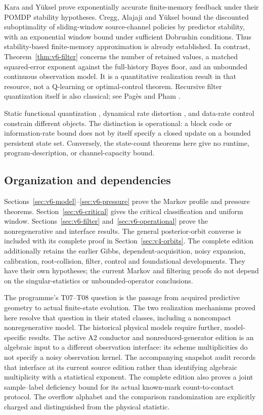Kara and Y\"uksel \cite[Theorem 12]{KaraYuksel2022} prove exponentially
accurate finite-memory feedback under their POMDP stability hypotheses.
Cregg, Alajaji and Y\"uksel \cite[Theorem 2 and Corollary 2]{CreggAlajajiYuksel2026}
bound the discounted suboptimality of sliding-window source-channel
policies by predictor stability, with an exponential window bound
under sufficient Dobrushin conditions. Thus stability-based
finite-memory approximation is already established. In contrast,
Theorem~\ref{thm:v6-filter} concerns the number of retained values,
a matched squared-error exponent against the full-history Bayes
floor, and an unbounded continuous observation model. It is a
quantitative realization result in that resource, not a Q-learning
or optimal-control theorem. Recursive filter quantization itself is
also classical; see Pag\`es and Pham \cite{PagesPham2005}.

Static functional quantization \cite{LuschgyPages2004}, dynamical
rate distortion \cite{LindenstraussTsukamoto2018}, and data-rate
control \cite{TatikondaMitter2004} constrain different objects.
The distinction is operational: a block code or information-rate bound
does not by itself specify a closed update on a bounded persistent
state set. Conversely, the state-count theorems here give no runtime,
program-description, or channel-capacity bound.

\subsection{Organization and dependencies}
Sections~\ref{sec:v6-model}--\ref{sec:v6-pressure} prove the Markov
profile and pressure theorems. Section~\ref{sec:v6-critical} gives the
critical classification and uniform window. Sections~\ref{sec:v6-filter}
and~\ref{sec:v6-operational} prove the nonregenerative and interface
results. The general posterior-orbit converse is included with its
complete proof in Section~\ref{sec:v4-orbits}.
The complete edition additionally retains the earlier Gibbs,
dependent-acquisition, noisy expansion, calibration, root-collision,
filter, control and foundational developments. They have their own
hypotheses; the current Markov and filtering proofs do not depend on
the singular-statistics or unbounded-operator conclusions.

The programme's T07--T08 question is the passage from acquired
predictive geometry to actual finite-state evolution. The two
realization mechanisms proved here resolve that question in their
stated classes, including a noncompact nonregenerative model. The
historical physical models require further, model-specific results.
The active A2 conductor and nonreduced-generator edition
\cite{QiA2v118} is an algebraic input to a different observation
interface: its scheme multiplicities do not specify a noisy
observation kernel. The accompanying snapshot audit records that
interface at its current source edition rather than identifying
algebraic multiplicity with a statistical exponent. The complete edition
also proves a joint sample--label deficiency bound for its actual
known-mark count-to-contact protocol. The overflow alphabet and the
comparison randomization are explicitly charged and distinguished from
the physical statistic.
